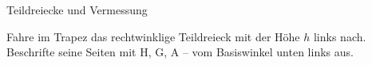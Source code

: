 \setcounter{aufgabe}{22}

\begin{aufgabe}{Teildreiecke und Vermessung}
\begin{teile}
\teil Fahre im Trapez das rechtwinklige Teildreieck mit der Höhe $h$ links nach. Beschrifte seine Seiten mit H, G, A – vom Basiswinkel unten links aus.


\end{teile}
\end{aufgabe}

